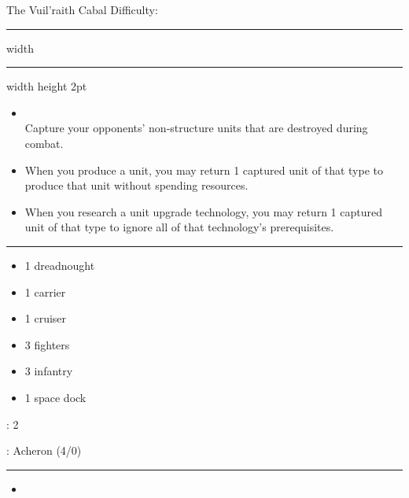 {\handel\Huge The Vuil'raith Cabal} \hfill {\Large Difficulty: \hard} \vspace{-4pt}\\
\hrule width \hsize \kern 1mm \hrule width \hsize height 2pt


\begin{multicols}{2}


\begin{itemize}
\item {}\\
Capture your opponents' non-structure units that are destroyed during combat.
\item {} When you produce a unit, you may return 1 captured unit of that type to produce that unit without spending resources.
\item {} When you research a unit upgrade technology, you may return 1 captured unit of that type to ignore all of that technology's prerequisites.
\end{itemize}


\vspace{-10pt}\rule{\hsize}{0.4pt}\vspace{5pt}


\vspace{-5pt}
\begin{multicols}{2}
\begin{itemize}
\item 1 dreadnought
\item 1 carrier
\item 1 cruiser
\item 3 fighters
\item 3 infantry
\item 1 space dock
\end{itemize}
\end{multicols}

\vspace{-5pt}
: 2

\vspace{2pt}
: Acheron (4/0)

\rule{\hsize}{0.4pt}\vspace{5pt}


\begin{itemize}
\item \assembly
\end{itemize}


\end{multicols}

